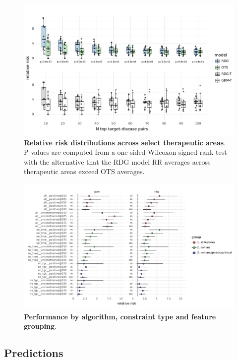 \documentclass{article}
\begin{document}
\begin{figure}[H]
  \centering
  \captionsetup{width=.9\linewidth}
  \includegraphics[width=1\textwidth]{relative_risk_dist_across_ta.pdf}
  \caption{
    \textbf{Relative risk distributions across select therapeutic areas}.
    P-values are computed from a one-sided Wilcoxon signed-rank test with the alternative that the RDG model RR averages across therapeutic areas exceed OTS averages.
  }
  \label{fig:relative_risk_dist_across_ta}
\end{figure}

\begin{figure}[H]
  \centering
  \captionsetup{width=.9\linewidth}
  \includegraphics[width=1\textwidth]{relative_risk_model_features.pdf}
  \caption{
    \textbf{Performance by algorithm, constraint type and feature grouping}.  
  }
  \label{fig:relative_risk_model_features}
\end{figure}


\subsection{Predictions}
\end{document}
